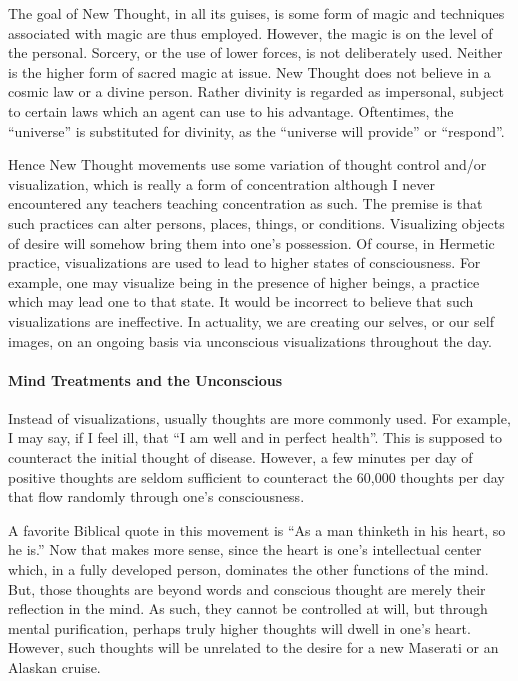 The goal of New Thought, in all its guises, is some form of magic and techniques associated with magic are thus employed. However, the magic is on the level of the personal. Sorcery, or the use of lower forces, is not deliberately used. Neither is the higher form of sacred magic at issue. New Thought does not believe in a cosmic law or a divine person. Rather divinity is regarded as impersonal, subject to certain laws which an agent can use to his advantage. Oftentimes, the ``universe'' is substituted for divinity, as the ``universe will provide'' or ``respond''.

Hence New Thought movements use some variation of thought control and/or visualization, which is really a form of concentration although I never encountered any teachers teaching concentration as such. The premise is that such practices can alter persons, places, things, or conditions. Visualizing objects of desire will somehow bring them into one's possession. Of course, in Hermetic practice, visualizations are used to lead to higher states of consciousness. For example, one may visualize being in the presence of higher beings, a practice which may lead one to that state. It would be incorrect to believe that such visualizations are ineffective. In actuality, we are creating our selves, or our self images, on an ongoing basis via unconscious visualizations throughout the day.

\paragraph{Mind Treatments and the Unconscious}


Instead of visualizations, usually thoughts are more commonly used. For example, I may say, if I feel ill, that ``I am well and in perfect health''. This is supposed to counteract the initial thought of disease. However, a few minutes per day of positive thoughts are seldom sufficient to counteract the 60,000 thoughts per day that flow randomly through one's consciousness.

A favorite Biblical quote in this movement is ``As a man thinketh in his heart, so he is.'' Now that makes more sense, since the heart is one's intellectual center which, in a fully developed person, dominates the other functions of the mind. But, those thoughts are beyond words and conscious thought are merely their reflection in the mind. As such, they cannot be controlled at will, but through mental purification, perhaps truly higher thoughts will dwell in one's heart. However, such thoughts will be unrelated to the desire for a new Maserati or an Alaskan cruise.

